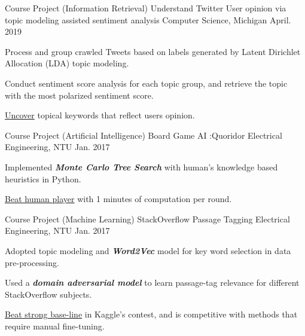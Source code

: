 \begin{cventries}

    \cventry
    {Course Project (Information Retrieval)}
    {Understand Twitter User opinion via topic modeling assisted sentiment analysis}
    {Computer Science, Michigan}
    {April. 2019}
    {
      \begin{cvitems}
        \item {Process and group crawled Tweets based on labels generated by Latent Dirichlet Allocation (LDA) topic modeling.}
        \item {Conduct sentiment score analysis for each topic group, and retrieve the topic with the most polarized sentiment score.}
        \item {\underline{Uncover} topical keywords that reflect users opinion.}
      \end{cvitems}
    }


   \cventry
    {Course Project (Artificial Intelligence)}
    {Board Game AI :Quoridor}
    {Electrical Engineering, NTU}
    {Jan. 2017}
    { 
      \begin{cvitems}
        \item {Implemented \textbf{\textit{Monte Carlo Tree Search}} with human's knowledge based heuristics in Python.}
        \item {\underline{Beat human player} with 1 minutes of computation per round.}
      \end{cvitems}
    }
    
   \cventry
    {Course Project (Machine Learning)}
    {StackOverflow Passage Tagging}
    {Electrical Engineering, NTU}
    {Jan. 2017}
    {
      \begin{cvitems}
        \item {Adopted topic modeling and \textbf{\textit{Word2Vec}} model for key word selection in data pre-processing.}
        \item {Used a \textbf{\textit{domain adversarial model}} to learn passage-tag relevance for different StackOverflow subjects.}
        \item {\underline{Beat strong base-line} in Kaggle's contest, and is competitive with methods that require manual fine-tuning.}
      \end{cvitems}
    }
    
    
    
  
  
\end{cventries}
